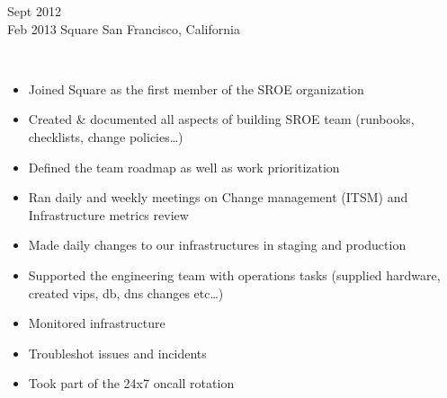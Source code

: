 \documentclass[]{cv-style}          %
\begin{document}
\begin{entrylist}
\entry
{Sept 2012\\Feb 2013}
{Square}
{San Francisco, California}
{ \\
\begin{itemize}
\item Joined Square as the first member of the SROE organization
\item Created \& documented all aspects of building SROE team (runbooks, checklists, change policies…)
\item Defined the team roadmap as well as work prioritization
\item Ran daily and weekly meetings on Change management (ITSM) and Infrastructure metrics review 
\item Made daily changes to our infrastructures in staging and production
\item Supported the engineering team with operations tasks (supplied hardware, created vips, db, dns changes etc…)
\item Monitored infrastructure
\item Troubleshot issues and incidents 
\item Took part of the 24x7 oncall rotation
\end{itemize}\vspace{+10pt}}


\end{entrylist}
\end{document}

